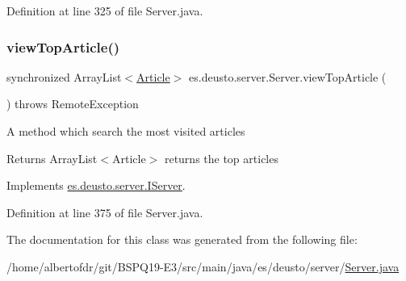 Definition at line 325 of file Server.\+java.

\mbox{\label{classes_1_1deusto_1_1server_1_1_server_ada6d55bcd79444de821eaeb6b21c44b8}} 
\subsubsection{\texorpdfstring{view\+Top\+Article()}{viewTopArticle()}}
{\footnotesize\ttfamily synchronized Array\+List$<$\hyperlink{classes_1_1deusto_1_1server_1_1jdo_1_1_article}{Article}$>$ es.\+deusto.\+server.\+Server.\+view\+Top\+Article (\begin{DoxyParamCaption}{ }\end{DoxyParamCaption}) throws Remote\+Exception}

A method which search the most visited articles \begin{DoxyReturn}{Returns}
Array\+List$<$\+Article$>$ returns the top articles 
\end{DoxyReturn}


Implements \hyperlink{interfacees_1_1deusto_1_1server_1_1_i_server_ab1b33472017b55ae84bf849430db5f1b}{es.\+deusto.\+server.\+I\+Server}.



Definition at line 375 of file Server.\+java.



The documentation for this class was generated from the following file\+:\begin{DoxyCompactItemize}
\item 
/home/albertofdr/git/\+B\+S\+P\+Q19-\/\+E3/src/main/java/es/deusto/server/\hyperlink{_server_8java}{Server.\+java}\end{DoxyCompactItemize}
